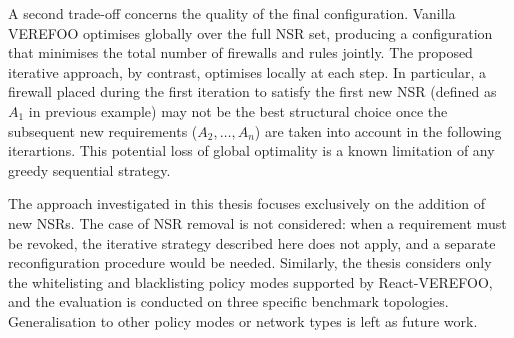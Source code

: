 A second trade-off concerns the quality of the final configuration. Vanilla VEREFOO optimises globally over the full NSR set, producing a configuration that minimises the total number of firewalls and rules jointly. The proposed iterative approach, by contrast, optimises locally at each step. In particular, a firewall placed during the first iteration to satisfy the first new NSR (defined as $A_1$ in previous example) may not be the best structural choice once the subsequent new requirements ($A_2, \ldots, A_n$) are taken into account in the following iterartions. This potential loss of global optimality is a known limitation of any greedy sequential strategy.





The approach investigated in this thesis focuses exclusively on the addition of new NSRs. The case of NSR removal is not considered: when a requirement must be revoked, the iterative strategy described here does not apply, and a separate reconfiguration procedure would be needed. Similarly, the thesis considers only the whitelisting and blacklisting policy modes supported by React-VEREFOO, and the evaluation is conducted on three specific benchmark topologies. Generalisation to other policy modes or network types is left as future work.

